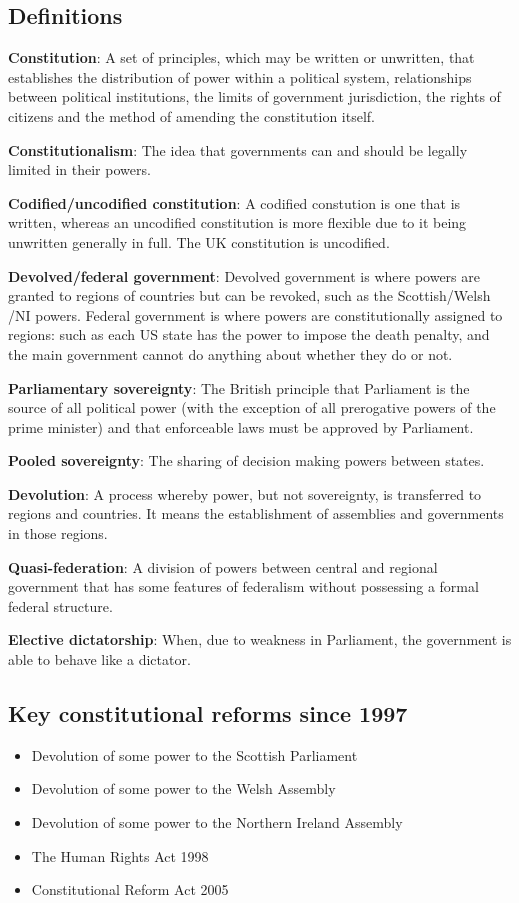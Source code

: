 \documentclass[12pt]{article}
\begin{document}
\subsection*{Definitions}

\textbf{Constitution}: A set of principles, which may be written or
unwritten, that establishes the distribution of power within a political
system, relationships between political institutions, the limits of
government jurisdiction, the rights of citizens and the method of amending
the constitution itself.

\textbf{Constitutionalism}: The idea that governments can and should be legally limited in their powers.

\textbf{Codified\slash uncodified constitution}: A codified constution is one that is written, whereas an uncodified constitution is more flexible due to it being unwritten generally in full.  The UK constitution is uncodified.

\textbf{Devolved\slash federal government}: Devolved government is where powers are granted to regions of countries but can be revoked, such as the Scottish\slash Welsh \slash NI powers.  Federal government is where powers are constitutionally assigned to regions: such as each US state has the power to impose the death penalty, and the main government cannot do anything about whether they do or not.

\textbf{Parliamentary sovereignty}: The British principle that Parliament
is the source of all political power (with the exception of all prerogative
powers of the prime minister) and that enforceable laws must be approved by
Parliament.

\textbf{Pooled sovereignty}: The sharing of decision making powers between states.

\textbf{Devolution}: A process whereby power, but not sovereignty, is
transferred to regions and countries.  It means the establishment of
assemblies and governments in those regions.

\textbf{Quasi-federation}: A division of powers between central and regional government that has some features of federalism without possessing a formal federal structure.

\textbf{Elective dictatorship}: When, due to weakness in Parliament, the government is able to behave like a dictator.

\subsection*{Key constitutional reforms since 1997}

\begin{itemize}
	\item{Devolution of some power to the Scottish Parliament}
	\item{Devolution of some power to the Welsh Assembly}
	\item{Devolution of some power to the Northern Ireland Assembly}
	\item{The Human Rights Act 1998}
	\item{Constitutional Reform Act 2005}
\end{itemize}
\end{document}

